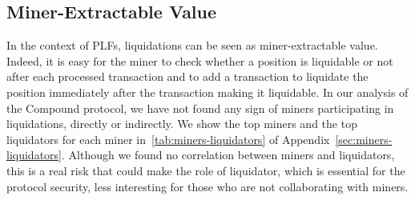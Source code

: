 \subsection{Miner-Extractable Value}
In the context of PLFs, liquidations can be seen as miner-extractable value.
Indeed, it is easy for the miner to check whether a position is liquidable or not after each processed transaction and to add a transaction to liquidate the position immediately after the transaction making it liquidable.
In our analysis of the Compound protocol, we have not found any sign of miners participating in liquidations, directly or indirectly.
We show the top miners and the top liquidators for each miner in~\autoref{tab:miners-liquidators} of Appendix~\ref{sec:miners-liquidators}.
Although we found no correlation between miners and liquidators, this is a real risk that could make the role of liquidator, which is essential for the protocol security, less interesting for those who are not collaborating with miners.
